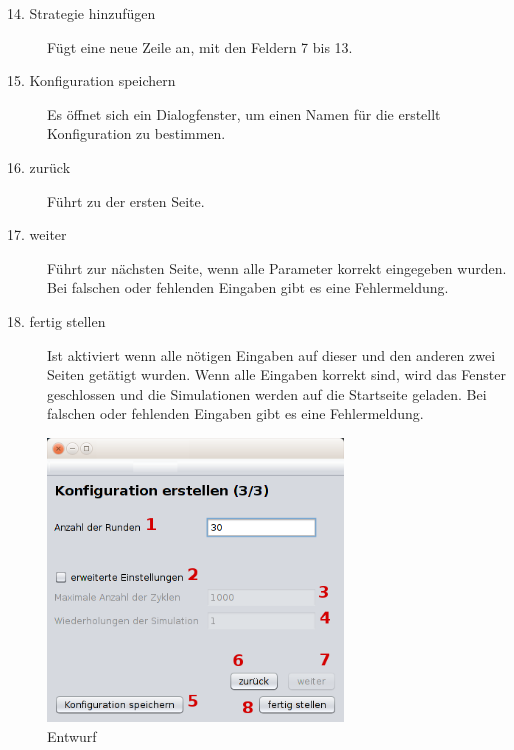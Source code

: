 \begin{description}
\item[14. Strategie hinzufügen] Fügt eine neue Zeile an, mit den Feldern 7 bis 13.

\item[15. Konfiguration speichern] Es öffnet sich ein Dialogfenster, um einen Namen für die erstellt Konfiguration zu bestimmen.

\item[16. zurück] Führt zu der ersten Seite.

\item[17. weiter] Führt zur nächsten Seite, wenn alle Parameter korrekt eingegeben wurden. Bei falschen oder fehlenden Eingaben gibt es eine Fehlermeldung.

\item[18. fertig stellen] Ist aktiviert wenn alle nötigen Eingaben auf dieser und den anderen zwei Seiten getätigt wurden. Wenn alle Eingaben korrekt sind, wird das Fenster geschlossen und die Simulationen werden auf die Startseite geladen. Bei falschen oder fehlenden Eingaben gibt es eine Fehlermeldung.

\end{description}

\pagebreak

\begin{figure}[hp] 
  \centering
     \includegraphics[width=0.7\textwidth]{GUI_Entwurf/WizardFenster3.png}
  \caption{Entwurf}
  \label{fig:Bild1}
\end{figure}

